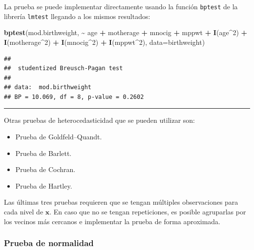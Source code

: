 \documentclass[
]{article}
\newenvironment{Shaded}{\begin{snugshade}}{\end{snugshade}}
\newcommand{\AttributeTok}[1]{\textcolor[rgb]{0.13,0.29,0.53}{#1}}
\newcommand{\DecValTok}[1]{\textcolor[rgb]{0.00,0.00,0.81}{#1}}
\newcommand{\FunctionTok}[1]{\textcolor[rgb]{0.13,0.29,0.53}{\textbf{#1}}}
\newcommand{\NormalTok}[1]{#1}
\newcommand{\SpecialCharTok}[1]{\textcolor[rgb]{0.81,0.36,0.00}{\textbf{#1}}}
\providecommand{\tightlist}{%
  \setlength{\itemsep}{0pt}\setlength{\parskip}{0pt}}
\begin{document}
La prueba se puede implementar directamente usando la función \texttt{bptest} de la librería \texttt{lmtest} llegando a los mismos resultados:

\begin{Shaded}
\begin{Highlighting}[]
\FunctionTok{bptest}\NormalTok{(mod.birthweight, }\SpecialCharTok{\textasciitilde{}}\NormalTok{ age }\SpecialCharTok{+}\NormalTok{ motherage }\SpecialCharTok{+}\NormalTok{ mnocig }\SpecialCharTok{+}\NormalTok{ mppwt }\SpecialCharTok{+}
                           \FunctionTok{I}\NormalTok{(age}\SpecialCharTok{\^{}}\DecValTok{2}\NormalTok{) }\SpecialCharTok{+} \FunctionTok{I}\NormalTok{(motherage}\SpecialCharTok{\^{}}\DecValTok{2}\NormalTok{) }\SpecialCharTok{+} \FunctionTok{I}\NormalTok{(mnocig}\SpecialCharTok{\^{}}\DecValTok{2}\NormalTok{) }\SpecialCharTok{+} \FunctionTok{I}\NormalTok{(mppwt}\SpecialCharTok{\^{}}\DecValTok{2}\NormalTok{), }
                         \AttributeTok{data=}\NormalTok{birthweight)}
\end{Highlighting}
\end{Shaded}

\begin{verbatim}
## 
##  studentized Breusch-Pagan test
## 
## data:  mod.birthweight
## BP = 10.069, df = 8, p-value = 0.2602
\end{verbatim}

\rule{\textwidth}{0.4pt}

Otras pruebas de heterocedasticidad que se pueden utilizar son:

\begin{itemize}
\tightlist
\item
  Prueba de Goldfeld--Quandt.
\item
  Prueba de Barlett.
\item
  Prueba de Cochran.
\item
  Prueba de Hartley.
\end{itemize}

Las últimas tres pruebas requieren que se tengan múltiples observaciones para cada nivel de \(\boldsymbol x\). En caso que no se tengan repeticiones, es posible agruparlas por los vecinos más cercanos e implementar la prueba de forma aproximada.

\hypertarget{prueba-de-normalidad}{%
\subsubsection{Prueba de normalidad}\label{prueba-de-normalidad}}
\end{document}
